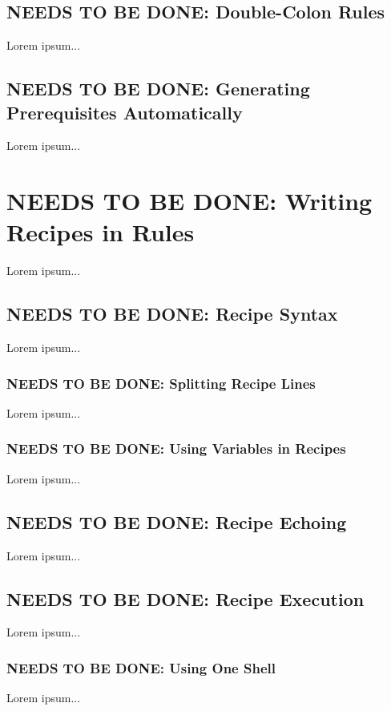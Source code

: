 \documentclass{charun}
\begin{document}
\begin{multicols*}{2}
\color{gray}
\subsection{NEEDS TO BE DONE: Double-Colon Rules}
Lorem ipsum...
\color{black}

\color{gray}
\subsection{NEEDS TO BE DONE: Generating Prerequisites Automatically}
Lorem ipsum...
\color{black}


\color{gray}
\section{NEEDS TO BE DONE: Writing Recipes in Rules}
Lorem ipsum...
\color{black}


\color{gray}
\subsection{NEEDS TO BE DONE: Recipe Syntax}
Lorem ipsum...
\color{black}

\color{gray}
\subsubsection{NEEDS TO BE DONE: Splitting Recipe Lines}
Lorem ipsum...
\color{black}

\color{gray}
\subsubsection{NEEDS TO BE DONE: Using Variables in Recipes}
Lorem ipsum...
\color{black}

\color{gray}
\subsection{NEEDS TO BE DONE: Recipe Echoing}
Lorem ipsum...
\color{black}

\color{gray}
\subsection{NEEDS TO BE DONE: Recipe Execution}
Lorem ipsum...
\color{black}

\color{gray}
\subsubsection{NEEDS TO BE DONE: Using One Shell}
Lorem ipsum...
\color{black}


\end{multicols*}
\end{document}
